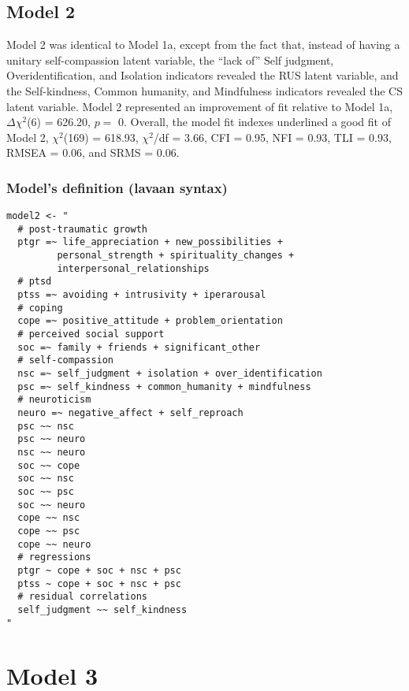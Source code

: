 \documentclass[aps,floatfix,prl]{revtex4}
\begin{document}
\newpage

\hypertarget{model-2}{%
\subsection{Model 2}\label{model-2}}

Model 2 was identical to Model 1a, except from the fact that, instead of
having a unitary self-compassion latent variable, the ``lack of'' Self
judgment, Overidentification, and Isolation indicators revealed the RUS
latent variable, and the Self-kindness, Common humanity, and Mindfulness
indicators revealed the CS latent variable. Model 2 represented an
improvement of fit relative to Model 1a, \(\Delta \chi^2\)(6) = 626.20,
\(p =\) 0. Overall, the model fit indexes underlined a good fit of Model
2, \(\chi^2\)(169) = 618.93, \(\chi^2\)/df = 3.66, CFI = 0.95, NFI =
0.93, TLI = 0.93, RMSEA = 0.06, and SRMS = 0.06.

\hypertarget{models-definition-lavaan-syntax-3}{%
\subsubsection{Model's definition (lavaan
syntax)}\label{models-definition-lavaan-syntax-3}}

\begin{verbatim}
model2 <- "
  # post-traumatic growth
  ptgr =~ life_appreciation + new_possibilities + 
         personal_strength + spirituality_changes + 
         interpersonal_relationships
  # ptsd
  ptss =~ avoiding + intrusivity + iperarousal
  # coping
  cope =~ positive_attitude + problem_orientation 
  # perceived social support
  soc =~ family + friends + significant_other
  # self-compassion
  nsc =~ self_judgment + isolation + over_identification
  psc =~ self_kindness + common_humanity + mindfulness
  # neuroticism
  neuro =~ negative_affect + self_reproach
  psc ~~ nsc
  psc ~~ neuro
  nsc ~~ neuro
  soc ~~ cope
  soc ~~ nsc
  soc ~~ psc
  soc ~~ neuro
  cope ~~ nsc
  cope ~~ psc
  cope ~~ neuro
  # regressions
  ptgr ~ cope + soc + nsc + psc 
  ptss ~ cope + soc + nsc + psc 
  # residual correlations
  self_judgment ~~ self_kindness
"
\end{verbatim}

\newpage

\hypertarget{model-3}{%
\section{Model 3}\label{model-3}}
\end{document}
